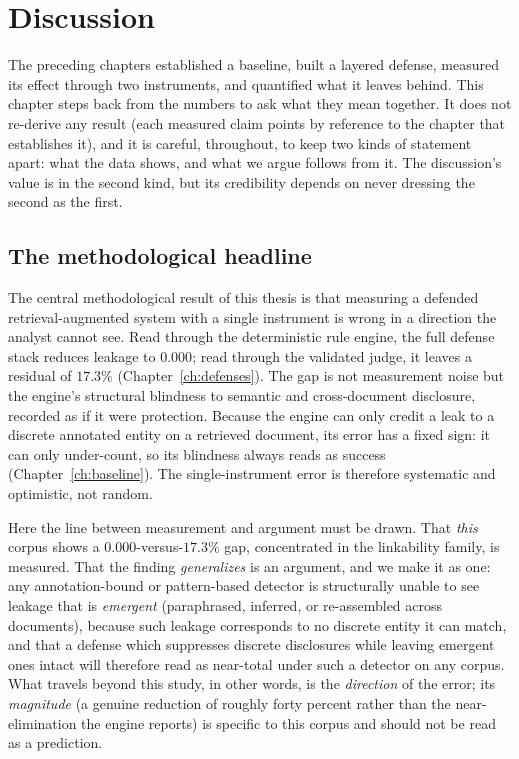 \chapter{Discussion}
\label{ch:discussion}

The preceding chapters established a baseline, built a layered defense, measured its effect
through two instruments, and quantified what it leaves behind. This chapter steps back from the
numbers to ask what they mean together. It does not re-derive any result (each measured claim
points by reference to the chapter that establishes it), and it is careful, throughout, to
keep two kinds of statement apart: what the data shows, and what we argue follows from it. The
discussion's value is in the second kind, but its credibility depends on never dressing the
second as the first.

\section{The methodological headline}
\label{sec:disc-headline}

The central methodological result of this thesis is that measuring a defended
retrieval-augmented system with a single instrument is wrong in a direction the analyst cannot
see. Read through the deterministic rule engine, the full defense stack reduces leakage to
$0.000$; read through the validated judge, it leaves a residual of $17.3\%$
(Chapter~\ref{ch:defenses}). The gap is not measurement noise but the engine's structural
blindness to semantic and cross-document disclosure, recorded as if it were protection. Because
the engine can only credit a leak to a discrete annotated entity on a retrieved document, its
error has a fixed sign: it can only under-count, so its blindness always reads as success
(Chapter~\ref{ch:baseline}). The single-instrument error is therefore systematic and
optimistic, not random.

Here the line between measurement and argument must be drawn. That \emph{this} corpus shows a
$0.000$-versus-$17.3\%$ gap, concentrated in the linkability family, is measured. That the
finding \emph{generalizes} is an argument, and we make it as one: any
annotation-bound or pattern-based detector is structurally unable to see leakage that is
\emph{emergent} (paraphrased, inferred, or re-assembled across documents), because such
leakage corresponds to no discrete entity it can match, and that a defense which suppresses
discrete disclosures while leaving emergent ones intact will therefore read as near-total under
such a detector on any corpus. What travels beyond this study, in other words, is the
\emph{direction} of the error; its \emph{magnitude} (a genuine reduction of roughly forty
percent rather than the near-elimination the engine reports) is specific to this corpus and
should not be read as a prediction.

